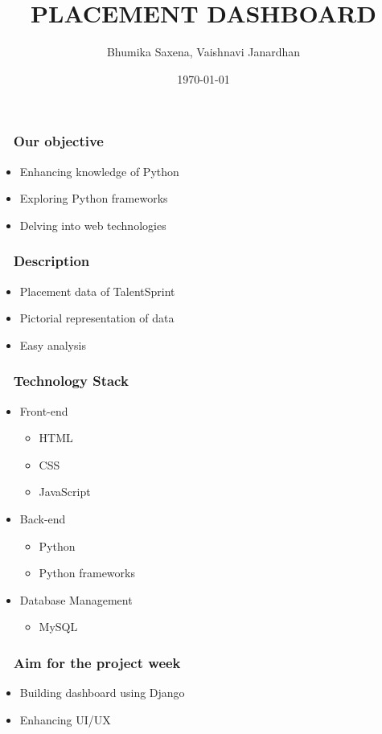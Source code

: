 \documentclass{beamer}
\title[Placement Dashboard]{PLACEMENT DASHBOARD } %
\author[Bhumika, Vaishnavi]{Bhumika Saxena, Vaishnavi Janardhan} %
{
\medskip
}
\date{\today} %
\begin{document}
\begin{frame}
\titlepage %
\end{frame}

\begin{frame}
\frametitle{ ~ Our objective} 
\begin{itemize}
\item{Enhancing knowledge of Python}
\item{Exploring Python frameworks}
\item{Delving into web technologies} 
\end{itemize}
\end{frame}

\begin{frame}
\frametitle{~ Description}
\begin {itemize}
\item{Placement data of TalentSprint}
\item{Pictorial representation of data}
\item{Easy analysis}
\end{itemize}
\end{frame}

\begin{frame}
\frametitle{ ~ Technology Stack} 
\begin {itemize}
\item Front-end
    \begin {itemize}
        \item{HTML} 
        \item{CSS}
        \item{JavaScript}
    \end{itemize}
\bigskip 
\item Back-end
    \begin {itemize}
        \item{Python} 
        \item{Python frameworks}
    \end{itemize}
\bigskip 
\item Database Management
    \begin {itemize}
        \item{MySQL}
    \end{itemize}
\end{itemize}
\end{frame}

\begin{frame}
\frametitle{ ~ Aim for the project week} 
\begin{itemize}
\item{Building dashboard using Django}
\item{Enhancing UI/UX}
\end{itemize}
\end{frame}
\end{document}
